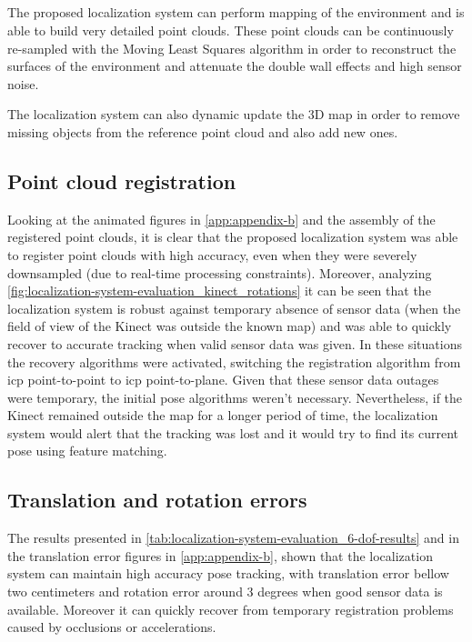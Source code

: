 \subsection{}

The proposed localization system can perform mapping of the environment and is able to build very detailed point clouds. These point clouds can be continuously re-sampled with the Moving Least Squares algorithm in order to reconstruct the surfaces of the environment and attenuate the double wall effects and high sensor noise.

The localization system can also dynamic update the 3D map in order to remove missing objects from the reference point cloud and also add new ones.


\subsection{Point cloud registration}

Looking at the animated figures in \cref{app:appendix-b} and the assembly of the registered point clouds, it is clear that the proposed localization system was able to register point clouds with high accuracy, even when they were severely downsampled (due to real-time processing constraints). Moreover, analyzing \cref{fig:localization-system-evaluation_kinect_rotations} it can be seen that the localization system is robust against temporary absence of sensor data (when the field of view of the Kinect was outside the known map) and was able to quickly recover to accurate tracking when valid sensor data was given. In these situations the recovery algorithms were activated, switching the registration algorithm from \gls{icp} point-to-point to \gls{icp} point-to-plane. Given that these sensor data outages were temporary, the initial pose algorithms weren't necessary. Nevertheless, if the Kinect remained outside the map for a longer period of time, the localization system would alert that the tracking was lost and it would try to find its current pose using feature matching.



\subsection{Translation and rotation errors}

The results presented in \cref{tab:localization-system-evaluation_6-dof-results} and in the translation error figures in \cref{app:appendix-b}, shown that the localization system can maintain high accuracy pose tracking, with translation error bellow two centimeters and rotation error around 3 degrees when good sensor data is available. Moreover it can quickly recover from temporary registration problems caused by occlusions or accelerations.

